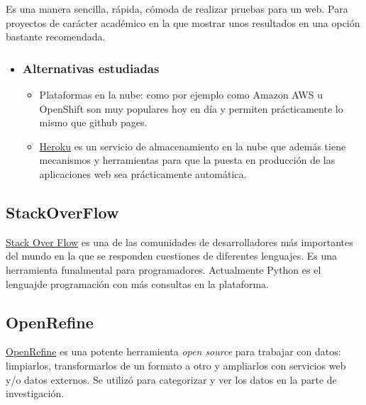 Es una manera sencilla, rápida, cómoda de realizar pruebas para un web. Para proyectos de carácter académico en la que mostrar unos resultados en una opción bastante recomendada.

\begin{itemize}
	\item \subsubsection{Alternativas estudiadas}
	\begin{itemize}
		\item Plataformas en la nube:  como por ejemplo como Amazon AWS u OpenShift son muy populares hoy en día y permiten prácticamente lo mismo que github pages.
		\item \href{https://www.heroku.com/}{Heroku}  es un servicio de almacenamiento en la nube que además tiene mecanismos y herramientas para que la puesta en producción de las aplicaciones web sea prácticamente automática.
	\end{itemize}
\end{itemize}
    
 \subsection{StackOverFlow}

\href{https://stackoverflow.com/}{Stack Over Flow} es una de las comunidades de desarrolladores más importantes del mundo en la que se responden cuestiones de diferentes lenguajes. Es una herramienta funalmental para programadores. Actualmente Python es el lenguajde programación con más consultas en la plataforma.

 \subsection{OpenRefine}

\href{https://github.com/OpenRefine/OpenRefine}{OpenRefine} es una potente herramienta \textit{open source} para trabajar con datos: limpiarlos, transformarlos de un formato a otro y ampliarlos con servicios web y/o datos externos. Se utilizó para categorizar y ver los datos en la parte de investigación.


